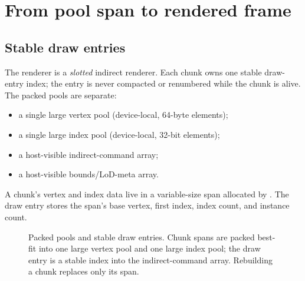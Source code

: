 \section{From pool span to rendered frame}
\label{sec:render}

\subsection{Stable draw entries}

The renderer is a \emph{slotted} indirect renderer.  Each chunk owns one
stable draw-entry index; the entry is never compacted or renumbered while
the chunk is alive.  The packed pools are separate:
\begin{itemize}
\item a single large vertex pool (device-local, 64-byte elements);
\item a single large index pool (device-local, 32-bit elements);
\item a host-visible indirect-command array;
\item a host-visible bounds/LoD-meta array.
\end{itemize}
A chunk's vertex and index data live in a variable-size span allocated by
.  The draw entry stores the span's base vertex,
first index, index count, and instance count.

\begin{figure}[htbp]
\centering
{}
\caption{Packed pools and stable draw entries.  Chunk spans are packed
best-fit into one large vertex pool and one large index pool; the draw
entry is a stable index into the indirect-command array.  Rebuilding a
chunk replaces only its span.}
\label{fig:pool}
\end{figure}


